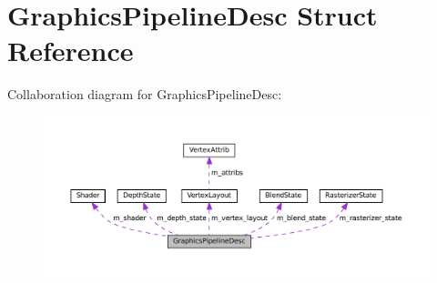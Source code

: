 \hypertarget{structGraphicsPipelineDesc}{}\section{Graphics\+Pipeline\+Desc Struct Reference}
\label{structGraphicsPipelineDesc}


Collaboration diagram for Graphics\+Pipeline\+Desc\+:
\nopagebreak
\begin{figure}[H]
\begin{center}
\leavevmode
\includegraphics[width=350pt]{structGraphicsPipelineDesc__coll__graph}
\end{center}
\end{figure}
